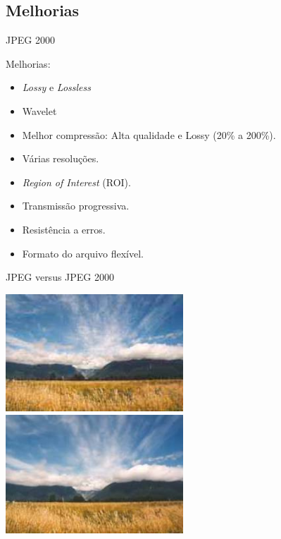 \documentclass{beamer}
\begin{document}
\subsection{Melhorias}
\begin{frame}{JPEG 2000}
   \begin{block}{Melhorias:}
      \begin{itemize}
         \item \emph{Lossy} e \emph{Lossless}
         \item Wavelet
         \item Melhor compressão: Alta qualidade e Lossy (20\% a 200\%).
         \item Várias resoluções.
         \item \emph{Region of Interest} (ROI).
         \item Transmissão progressiva.
         \item Resistência a erros.
         \item Formato do arquivo flexível.
      \end{itemize}
   \end{block}
\end{frame}
\begin{frame}{JPEG versus JPEG 2000}
   \begin{multicols}{2}
   \includegraphics[width=0.5\textwidth]{figure/ex_jpeg_01.jpg}
   \includegraphics[width=0.5\textwidth]{figure/ex_jpeg2k_01_2.jpg}
   \end{multicols}
\end{frame}
\end{document}

